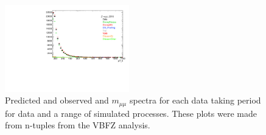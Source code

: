 \begin{figure}[p]
\includegraphics[width=0.48\textwidth,page=12]{figures/nonZjj_bkg_plots_VBFZ.pdf}
\caption{Predicted and observed \ptll{} and $m_{\mu\mu}$ spectra for each data taking period for data and a range of simulated processes.
These plots were made from n-tuples from the VBFZ analysis.}
\label{fig:bkgProcesses}
\end{figure}





